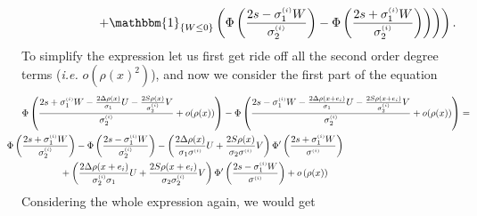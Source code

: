 \documentclass[12pt]{article}
\theoremstyle{Theorem}
\begin{document}
{\begin{align*}
& \left. \left. \hspace{2cm} + \mathbbm{1}_{\left\{ W \leq 0\right\}} \left(\Phi\left(\frac{2s - \sigma^{\scriptscriptstyle(i)}_{1}W}{\sigma^{\scriptscriptstyle(i)}_{2}} \right) - \Phi\left(\frac{2s +\sigma^{\scriptscriptstyle(i)}_{1}W }{\sigma^{\scriptscriptstyle(i)}_{2}} \right)\right)\right) \right).
\end{align*}
}To simplify the expression let us first get ride off all the second order degree terms (\textit{i.e.} $o(\rho(x)^{2})$), and now we consider the first part of the equation
{\small
\begin{align*}
\Phi\left(\frac{2s + \sigma^{\scriptscriptstyle(i)}_{1}W  - \frac{2\Delta \rho(x) }{\sigma_1} U - \frac{2S\rho(x)}{\sigma^{\scriptscriptstyle(i)}_{2}}V}{\sigma^{\scriptscriptstyle(i)}_{2}} + o(\rho(x))\right) - \Phi\left(\frac{2s -\sigma^{\scriptscriptstyle(i)}_{1}W  - \frac{2\Delta \rho(x+e_i) }{\sigma_1} U - \frac{2S\rho(x + e_i)}{\sigma^{\scriptscriptstyle(i)}_{2}}V}{\sigma^{\scriptscriptstyle(i)}_{2}} + o(\rho(x))\right) & = \\
& \hspace{-17cm}  \Phi\left(\frac{2s + \sigma^{\scriptscriptstyle(i)}_{1}W}{\sigma^{\scriptscriptstyle(i)}_{2}}\right) - \Phi\left(\frac{2s - \sigma^{\scriptscriptstyle(i)}_{1}W}{\sigma^{\scriptscriptstyle(i)}_{2}}\right)- \left(\frac{2\Delta \rho(x) }{\sigma_1\sigma^{\scriptscriptstyle(i)}} U + \frac{2S\rho(x)}{\sigma_2\sigma^{\scriptscriptstyle(i)}}V\right)\Phi'\left(\frac{2s + \sigma^{\scriptscriptstyle(i)}_{1}W}{\sigma^{\scriptscriptstyle(i)}}\right)\\ 
& \hspace{-15cm} + \left(\frac{2\Delta \rho(x+e_i) }{\sigma^{\scriptscriptstyle(i)}_{2}\sigma_1} U + \frac{2S\rho(x + e_i)}{\sigma_2\sigma^{\scriptscriptstyle(i)}_{2}}V\right)\Phi'\left(\frac{2s - \sigma^{\scriptscriptstyle(i)}_{1}W}{\sigma^{\scriptscriptstyle(i)}}\right) + o\left(\rho(x)\right) 
\end{align*}
}
Considering the whole expression again, we would get 
\end{document}
